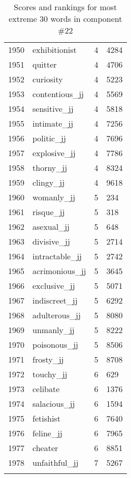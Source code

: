 \begin{longtable}[!htbp]{| rlr@{.}l |}
    1950 & exhibitionist & 4 & 4284 \\
    1951 & quitter & 4 & 4706 \\
    1952 & curiosity & 4 & 5223 \\
    1953 & contentious\_jj & 4 & 5569 \\
    1954 & sensitive\_jj & 4 & 5818 \\
    1955 & intimate\_jj & 4 & 7256 \\
    1956 & politic\_jj & 4 & 7696 \\
    1957 & explosive\_jj & 4 & 7786 \\
    1958 & thorny\_jj & 4 & 8324 \\
    1959 & clingy\_jj & 4 & 9618 \\
    1960 & womanly\_jj & 5 & 234 \\
    1961 & risque\_jj & 5 & 318 \\
    1962 & asexual\_jj & 5 & 648 \\
    1963 & divisive\_jj & 5 & 2714 \\
    1964 & intractable\_jj & 5 & 2742 \\
    1965 & acrimonious\_jj & 5 & 3645 \\
    1966 & exclusive\_jj & 5 & 5071 \\
    1967 & indiscreet\_jj & 5 & 6292 \\
    1968 & adulterous\_jj & 5 & 8080 \\
    1969 & unmanly\_jj & 5 & 8222 \\
    1970 & poisonous\_jj & 5 & 8506 \\
    1971 & frosty\_jj & 5 & 8708 \\
    1972 & touchy\_jj & 6 & 629 \\
    1973 & celibate & 6 & 1376 \\
    1974 & salacious\_jj & 6 & 1594 \\
    1975 & fetishist & 6 & 7640 \\
    1976 & feline\_jj & 6 & 7965 \\
    1977 & cheater & 6 & 8851 \\
    1978 & unfaithful\_jj & 7 & 5267 \\
    \hline
    \caption{Scores and rankings for most extreme 30 words in component \#22} \\
\end{longtable}
